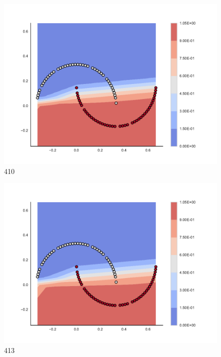 \begin{subfigure}[b]{0.09\textwidth}
    \includegraphics[clip, trim=2.35cm 1.75cm 4.5cm 0cm,width=\textwidth]{img/convergence/410.pdf}
    \caption{410}
    \label{fig:convergence_410}
\end{subfigure}
%
\begin{subfigure}[b]{0.09\textwidth}
    \includegraphics[clip, trim=2.35cm 1.75cm 4.5cm 0cm,width=\textwidth]{img/convergence/413.pdf}
    \caption{413}
    \label{fig:convergence_413}
\end{subfigure}
%
